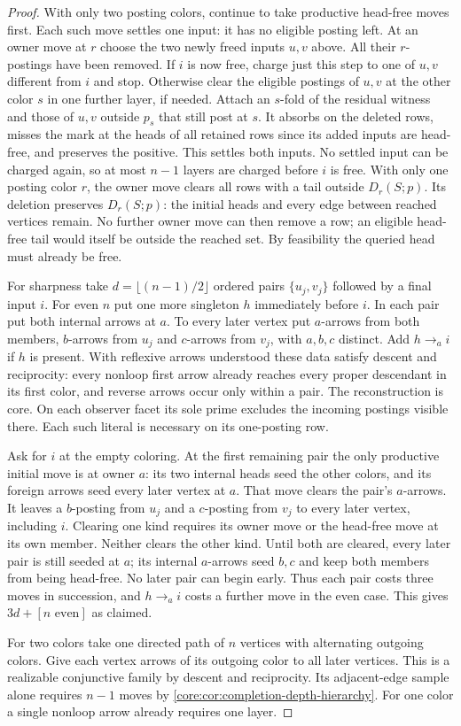 \begin{proof}
With only two posting colors, continue to take productive head-free
moves first. Each such move settles one input: it has no eligible
posting left. At an owner move at $r$ choose the two newly freed
inputs $u,v$ above. All their $r$-postings have been removed. If $i$
is now free, charge just this step to one of $u,v$ different from $i$
and stop. Otherwise clear the eligible postings of $u,v$ at the other
color $s$ in one further layer, if needed. Attach an $s$-fold of the
residual witness and those of $u,v$ outside $p_s$ that still post at
$s$. It absorbs on the deleted rows, misses the mark at the heads of
all retained rows since its added inputs are head-free, and preserves
the positive. This settles both inputs. No settled input can be charged
again, so at most $n-1$ layers are charged before $i$ is free.
With only one posting color $r$, the owner move clears all rows with
a tail outside $D_r(S;p)$. Its deletion preserves $D_r(S;p)$: the
initial heads and every edge between reached vertices remain. No
further owner move can then remove a row; an eligible head-free tail
would itself be outside the reached set. By feasibility the queried
head must already be free.

For sharpness take $d=\lfloor(n-1)/2\rfloor$ ordered pairs
$\{u_j,v_j\}$ followed by a final input $i$. For even $n$ put one
more singleton $h$ immediately before $i$. In each pair put both
internal arrows at $a$. To every later vertex put $a$-arrows from
both members, $b$-arrows from $u_j$ and $c$-arrows from $v_j$, with
$a,b,c$ distinct. Add $h\to_a i$ if $h$ is present. With reflexive
arrows understood these data satisfy descent and reciprocity: every
nonloop first arrow already reaches every proper descendant in its
first color, and reverse arrows occur only within a pair.
The reconstruction is core. On each observer facet its sole prime
excludes the incoming postings visible there. Each such literal
is necessary on its one-posting row.

Ask for $i$ at the empty coloring. At the first remaining pair the
only productive initial move is at owner $a$: its two internal heads
seed the other colors, and its foreign arrows seed every later
vertex at $a$. That move clears the pair's $a$-arrows. It leaves a
$b$-posting from $u_j$ and a $c$-posting from $v_j$ to every later
vertex, including $i$. Clearing one kind requires its owner move
or the head-free move at its own member. Neither clears the other
kind. Until both are cleared, every later pair is still seeded at
$a$; its internal $a$-arrows seed $b,c$ and keep both members from
being head-free. No later pair can begin early. Thus each pair costs
three moves in succession, and $h\to_a i$ costs a further move in
the even case. This gives $3d+[n\text{ even}]$ as claimed.

For two colors take one directed path of $n$ vertices with alternating
outgoing colors. Give each vertex arrows of its outgoing color to all
later vertices. This is a realizable conjunctive family by descent
and reciprocity. Its adjacent-edge sample alone requires $n-1$ moves
by \cref{core:cor:completion-depth-hierarchy}. For one color a single
nonloop arrow already requires one layer.
\end{proof}

